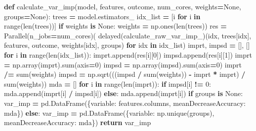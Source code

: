 \documentclass[
  11pt,
  oneside]{book}
\newenvironment{Shaded}{\begin{snugshade}}{\end{snugshade}}
\newcommand{\BuiltInTok}[1]{#1}
\newcommand{\ControlFlowTok}[1]{\textcolor[rgb]{0.13,0.29,0.53}{\textbf{#1}}}
\newcommand{\DecValTok}[1]{\textcolor[rgb]{0.00,0.00,0.81}{#1}}
\newcommand{\KeywordTok}[1]{\textcolor[rgb]{0.13,0.29,0.53}{\textbf{#1}}}
\newcommand{\NormalTok}[1]{#1}
\newcommand{\OperatorTok}[1]{\textcolor[rgb]{0.81,0.36,0.00}{\textbf{#1}}}
\newcommand{\StringTok}[1]{\textcolor[rgb]{0.31,0.60,0.02}{#1}}
\newcommand{\VariableTok}[1]{\textcolor[rgb]{0.00,0.00,0.00}{#1}}
\begin{document}
\begin{Shaded}
\begin{Highlighting}[]
\KeywordTok{def}\NormalTok{ calculate\_var\_imp(model, features, outcome, num\_cores, weights}\OperatorTok{=}\VariableTok{None}\NormalTok{, groups}\OperatorTok{=}\VariableTok{None}\NormalTok{):}
\NormalTok{    trees }\OperatorTok{=}\NormalTok{ model.estimators\_}
\NormalTok{    idx\_list }\OperatorTok{=}\NormalTok{ [i }\ControlFlowTok{for}\NormalTok{ i }\KeywordTok{in} \BuiltInTok{range}\NormalTok{(}\BuiltInTok{len}\NormalTok{(trees))]}
    \ControlFlowTok{if}\NormalTok{ weights }\KeywordTok{is} \VariableTok{None}\NormalTok{:}
\NormalTok{        weights }\OperatorTok{=}\NormalTok{ np.ones(}\BuiltInTok{len}\NormalTok{(trees))}
\NormalTok{    res }\OperatorTok{=}\NormalTok{ Parallel(n\_jobs}\OperatorTok{=}\NormalTok{num\_cores)(}
\NormalTok{      delayed(calculate\_raw\_var\_imp\_)(idx, trees[idx], features, outcome, weights[idx], groups) }\ControlFlowTok{for}\NormalTok{ idx }\KeywordTok{in}\NormalTok{ idx\_list)}
\NormalTok{    imprt, impsd }\OperatorTok{=}\NormalTok{ [], []}
    \ControlFlowTok{for}\NormalTok{ i }\KeywordTok{in} \BuiltInTok{range}\NormalTok{(}\BuiltInTok{len}\NormalTok{(idx\_list)):}
\NormalTok{        imprt.append(res[i][}\DecValTok{0}\NormalTok{])}
\NormalTok{        impsd.append(res[i][}\DecValTok{1}\NormalTok{])}
\NormalTok{    imprt }\OperatorTok{=}\NormalTok{ np.array(imprt).}\BuiltInTok{sum}\NormalTok{(axis}\OperatorTok{=}\DecValTok{0}\NormalTok{)}
\NormalTok{    impsd }\OperatorTok{=}\NormalTok{ np.array(impsd).}\BuiltInTok{sum}\NormalTok{(axis}\OperatorTok{=}\DecValTok{0}\NormalTok{)}
\NormalTok{    imprt }\OperatorTok{/=} \BuiltInTok{sum}\NormalTok{(weights)}
\NormalTok{    impsd }\OperatorTok{=}\NormalTok{ np.sqrt(((impsd }\OperatorTok{/} \BuiltInTok{sum}\NormalTok{(weights)) }\OperatorTok{{-}}\NormalTok{ imprt }\OperatorTok{*}\NormalTok{ imprt) }\OperatorTok{/} \BuiltInTok{sum}\NormalTok{(weights))}
\NormalTok{    mda }\OperatorTok{=}\NormalTok{ []}
    \ControlFlowTok{for}\NormalTok{ i }\KeywordTok{in} \BuiltInTok{range}\NormalTok{(}\BuiltInTok{len}\NormalTok{(imprt)):}
        \ControlFlowTok{if}\NormalTok{ impsd[i] }\OperatorTok{!=} \DecValTok{0}\NormalTok{:}
\NormalTok{            mda.append(imprt[i] }\OperatorTok{/}\NormalTok{ impsd[i])}
        \ControlFlowTok{else}\NormalTok{:}
\NormalTok{            mda.append(imprt[i])}
    \ControlFlowTok{if}\NormalTok{ groups }\KeywordTok{is} \VariableTok{None}\NormalTok{:}
\NormalTok{        var\_imp }\OperatorTok{=}\NormalTok{ pd.DataFrame(\{}\StringTok{\textquotesingle{}variable\textquotesingle{}}\NormalTok{: features.columns, }\StringTok{\textquotesingle{}meanDecreaseAccuracy\textquotesingle{}}\NormalTok{: mda\})}
    \ControlFlowTok{else}\NormalTok{:}
\NormalTok{        var\_imp }\OperatorTok{=}\NormalTok{ pd.DataFrame(\{}\StringTok{\textquotesingle{}variable\textquotesingle{}}\NormalTok{: np.unique(groups), }\StringTok{\textquotesingle{}meanDecreaseAccuracy\textquotesingle{}}\NormalTok{: mda\})}
    \ControlFlowTok{return}\NormalTok{ var\_imp}
\end{Highlighting}
\end{Shaded}
\end{document}

